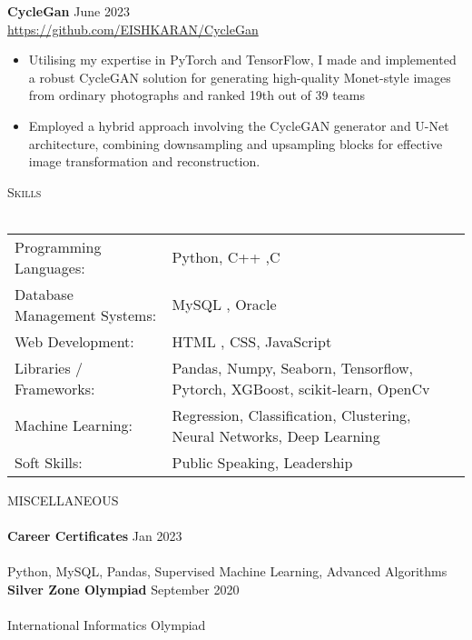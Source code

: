 \documentclass[a4paper]{article}
\newcommand{\lineunder} {
    \vspace*{-8pt} \\
    \hspace*{-18pt} \hrulefill \\
}
\newcommand{\header} [1] {
    {\hspace*{-18pt}\vspace*{6pt} \textsc{#1}}
    \vspace*{-6pt} \lineunder
}
\begin{document}
{\textbf{CycleGan }} \hfill June 2023\\
\vspace{-1mm}
\url{https://github.com/EISHKARAN/CycleGan} \\
\vspace{-2.5mm}
\begin{itemize} 
    \item Utilising my expertise in PyTorch and TensorFlow, I made and implemented a robust CycleGAN solution for generating high-quality Monet-style images from ordinary photographs and ranked 19th out of 39 teams
    \vspace{-2.5mm}
    \item Employed a hybrid approach involving the CycleGAN generator and U-Net architecture, combining downsampling and upsampling blocks for effective image transformation and reconstruction.
\end{itemize}
\header{Skills}
\vspace{0.5mm}
\begin{tabular}{ l l }
	Programming Languages: & Python, C++ ,C  \\
	\vspace{1mm}
	Database Management Systems: & MySQL , Oracle \\ 
	Web Development:       & HTML , CSS, JavaScript   \\
	Libraries / Frameworks: & Pandas, Numpy, Seaborn, Tensorflow, Pytorch, XGBoost, scikit-learn, OpenCv        \\
	Machine Learning:             & Regression, Classification, Clustering, Neural Networks, Deep Learning\\
	Soft Skills:           &  Public Speaking, Leadership  \\
	
\end{tabular}

\vspace{1mm}
\header{MISCELLANEOUS}
{\textbf{Career Certificates }} \hfill Jan 2023\\  \\Python, MySQL, Pandas, Supervised Machine Learning, Advanced Algorithms\\ 
{\textbf{Silver Zone Olympiad }} \hfill September 2020\\  \\International Informatics Olympiad\\ 
\end{document}
